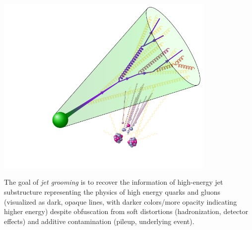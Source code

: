 \begin{sourcefigure}[t!]
    \centering
    \includegraphics[width=0.8\textwidth]{figures/picturebook/jet-contamination}

    \caption[A visualization of the low-energy contamination within jets, whose removal is the goal of jet grooming.]{
        The goal of \emph{jet grooming} is to recover the information of high-energy jet substructure representing the physics of high energy quarks and gluons (visualized as dark, opaque lines, with darker colors/more opacity indicating higher energy) despite obfuscation from soft distortions (hadronization, detector effects) and additive contamination (pileup, underlying event).
    }

    \label{fig:picturebook_substructure}
\end{sourcefigure}


